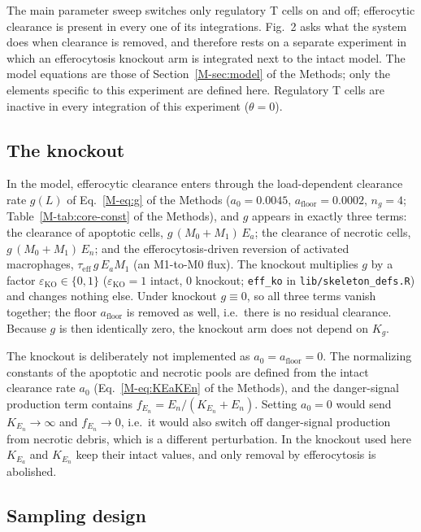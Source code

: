 \documentclass[11pt]{article}
\begin{document}
The main parameter sweep switches only regulatory T cells on and off; efferocytic
clearance is present in every one of its integrations. Fig.~2 asks what the
system does when clearance is removed, and therefore rests on a separate
experiment in which an efferocytosis knockout arm is integrated next to the intact
model. The model equations are those of Section~\ref{M-sec:model} of the Methods; only the elements
specific to this experiment are defined here. Regulatory T cells are inactive in
every integration of this experiment ($\theta = 0$).

\subsection{The knockout}
\label{sec:fig1-ko}

In the model, efferocytic clearance enters through the load-dependent clearance rate
$g(L)$ of Eq.~\ref{M-eq:g} of the Methods ($a_0 = 0.0045$, $a_{\mathrm{floor}} = 0.0002$, $n_g = 4$;
Table~\ref{M-tab:core-const} of the Methods), and $g$ appears in
exactly three terms: the clearance of apoptotic cells, $g\,(M_0+M_1)\,E_a$; the
clearance of necrotic cells, $g\,(M_0+M_1)\,E_n$; and the efferocytosis-driven
reversion of activated macrophages, $\tau_{\mathrm{eff}}\, g\, E_a M_1$ (an M1-to-M0
flux). The knockout multiplies $g$ by a factor $\varepsilon_{\mathrm{KO}} \in \{0,1\}$
($\varepsilon_{\mathrm{KO}}=1$ intact, $0$ knockout; \texttt{eff\_ko} in
\texttt{lib/skeleton\_defs.R}) and changes nothing else. Under knockout
$g \equiv 0$, so all three terms vanish together; the floor $a_{\mathrm{floor}}$ is
removed as well, i.e.\ there is no residual clearance. Because $g$ is then identically
zero, the knockout arm does not depend on $K_g$.

The knockout is deliberately not implemented as $a_0 = a_{\mathrm{floor}} = 0$. The
normalizing constants of the apoptotic and necrotic pools are defined from the
intact clearance rate $a_0$ (Eq.~\ref{M-eq:KEaKEn} of the Methods),
and the danger-signal production term contains $f_{E_n} = E_n/(K_{E_n} + E_n)$.
Setting $a_0 = 0$ would send $K_{E_n} \to \infty$ and $f_{E_n} \to 0$, i.e.\ it
would also switch off danger-signal production from necrotic debris, which is a
different perturbation. In the knockout used here $K_{E_a}$ and $K_{E_n}$ keep
their intact values, and only removal by efferocytosis is abolished.

\subsection{Sampling design}
\label{sec:fig1-design}
\end{document}
